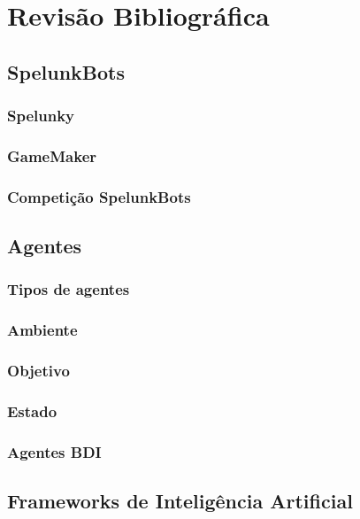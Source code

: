 \chapter{\label{chap:lit-review}Revisão Bibliográfica}

\section{SpelunkBots}

\subsection{Spelunky}

\subsection{GameMaker}

\subsection{Competição SpelunkBots}



\section{Agentes}
\subsection{Tipos de agentes}
\subsection{Ambiente}
\subsection{Objetivo}
\subsection{Estado}
\subsection{Agentes BDI}



\section{Frameworks de Inteligência Artificial}

